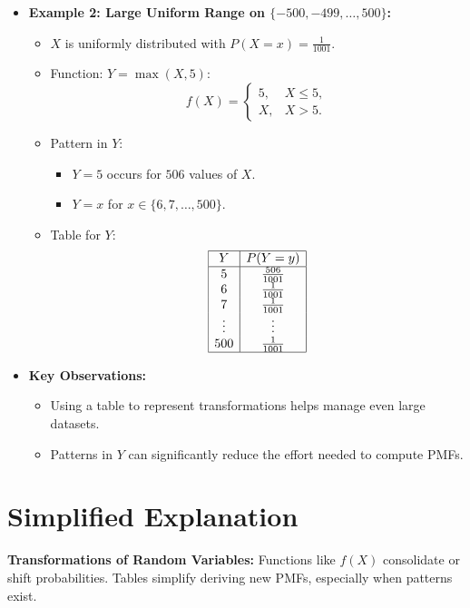 \documentclass{article}
\begin{document}
\begin{itemize}
  \item \textbf{Example 2: Large Uniform Range on $\{-500, -499, \dots, 500\}$:}
    \begin{itemize}
      \item $X$ is uniformly distributed with $P(X = x) = \frac{1}{1001}$.
      \item Function: $Y = \max(X, 5)$:
        \[
          f(X) =
          \begin{cases}
            5, & X \leq 5, \\
            X, & X > 5.
          \end{cases}
        \]
      \item Pattern in $Y$:
        \begin{itemize}
          \item $Y = 5$ occurs for $506$ values of $X$.
          \item $Y = x$ for $x \in \{6, 7, \dots, 500\}$.
        \end{itemize}
      \item Table for $Y$:
        \[
          \begin{array}{|c|c|}
            \hline
            Y & P(Y = y) \\ \hline
            5 & \frac{506}{1001} \\
            6 & \frac{1}{1001} \\
            7 & \frac{1}{1001} \\
            \vdots & \vdots \\
            500 & \frac{1}{1001} \\ \hline
          \end{array}
        \]
    \end{itemize}

  \item \textbf{Key Observations:}
    \begin{itemize}
      \item Using a table to represent transformations helps manage even large datasets.
      \item Patterns in $Y$ can significantly reduce the effort needed to compute PMFs.
    \end{itemize}
\end{itemize}

\section*{Simplified Explanation}

\textbf{Transformations of Random Variables:}
Functions like $f(X)$ consolidate or shift probabilities. Tables simplify deriving new PMFs, especially when patterns exist.
\end{document}
